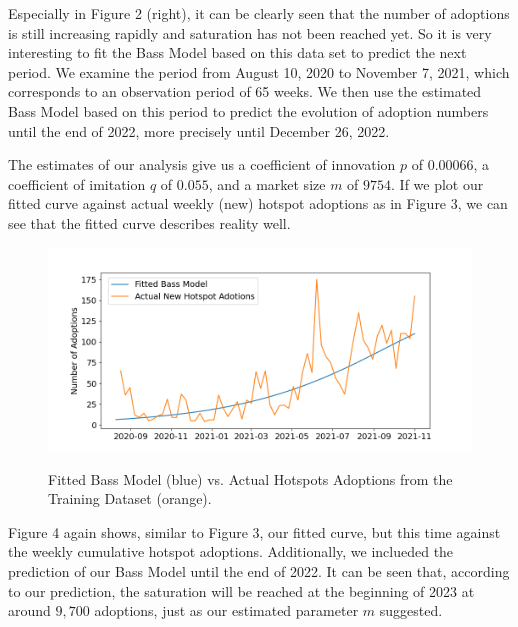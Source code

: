 \documentclass{article}
\begin{document}
\noindent Especially in Figure 2 (right), it can be clearly seen that the number of adoptions is still increasing rapidly and saturation has not been reached yet.
So it is very interesting to fit the Bass Model based on this data set to predict the next period. We examine the period from August 10, 2020 to November 7, 2021,
which corresponds to an observation period of 65 weeks. We then use the estimated Bass Model based on this period to predict the evolution of adoption numbers until
the end of 2022, more precisely until December 26, 2022.

\bigskip

\noindent The estimates of our analysis give us a coefficient of innovation $p$ of $0.00066$, a coefficient of imitation $q$ of $0.055$, and a market size $m$ of $9754$. If we
plot our fitted curve against actual weekly (new) hotspot adoptions as in Figure 3, we can see that the fitted curve describes reality well.

\begin{figure}[!hptb]
    \centering{}\includegraphics[scale=0.6]{plots/bass_model_adoptions_vs_actual_adoptions.png}\\
    \caption{Fitted Bass Model (blue) vs. Actual Hotspots Adoptions from the Training Dataset (orange).}
\end{figure}

\noindent Figure 4 again shows, similar to Figure 3, our fitted curve, but this time against the weekly cumulative hotspot adoptions. Additionally, we inclueded the prediction
of our Bass Model until the end of 2022. It can be seen that, according to our prediction, the saturation will be reached at the beginning of 2023 at around $9,700$ adoptions,
just as our estimated parameter $m$ suggested.

\bigskip
\bigskip
\bigskip
\bigskip
\end{document}
